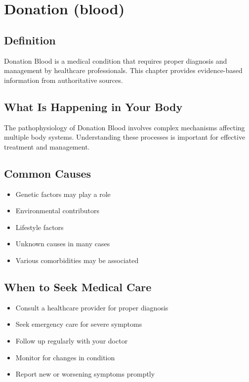 
\chapter{Donation (blood)}

\section*{Definition}
Donation Blood is a medical condition that requires proper diagnosis and management by healthcare professionals. This chapter provides evidence-based information from authoritative sources.

\section*{What Is Happening in Your Body}
The pathophysiology of Donation Blood involves complex mechanisms affecting multiple body systems. Understanding these processes is important for effective treatment and management.

\section*{Common Causes}
\begin{itemize}
  \item Genetic factors may play a role
  \item Environmental contributors
  \item Lifestyle factors
  \item Unknown causes in many cases
  \item Various comorbidities may be associated
\end{itemize}

\section*{When to Seek Medical Care}
\begin{itemize}
  \item Consult a healthcare provider for proper diagnosis
  \item Seek emergency care for severe symptoms
  \item Follow up regularly with your doctor
  \item Monitor for changes in condition
  \item Report new or worsening symptoms promptly
\end{itemize}

